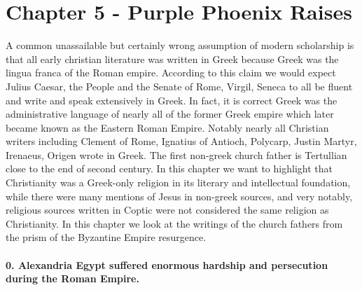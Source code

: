 \section{Chapter 5 - Purple Phoenix Raises}\label{par:chapter-5---purple-phoenix-raises}

A common unassailable but certainly wrong assumption of modern scholarship is that all early christian literature was written in Greek because Greek was the lingua franca of the Roman empire.
According to this claim we would expect Julius Caesar, the People and the Senate of Rome, Virgil, Seneca to all be fluent and write and speak extensively in Greek.
In fact, it is correct Greek was the administrative language of nearly all of the former Greek empire which later became known as the Eastern Roman Empire.
Notably nearly all Christian writers including Clement of Rome, Ignatius of Antioch, Polycarp, Justin Martyr, Irenaeus, Origen wrote in Greek.
The first non-greek church father is Tertullian close to the end of second century.
In this chapter we want to highlight that Christianity was a Greek-only religion in its literary and intellectual foundation, while there were many mentions of Jesus in non-greek sources, and very notably, religious sources written in Coptic were not considered the same religion as Christianity.
In this chapter we look at the writings of the church fathers from the prism of the Byzantine Empire resurgence.

\paragraph{0.
Alexandria Egypt suffered enormous hardship and persecution during the Roman Empire.}\label{par:alexandria-egypt-suffered-enormous-hardship-and-persecution-during-the-roman-empire.}

